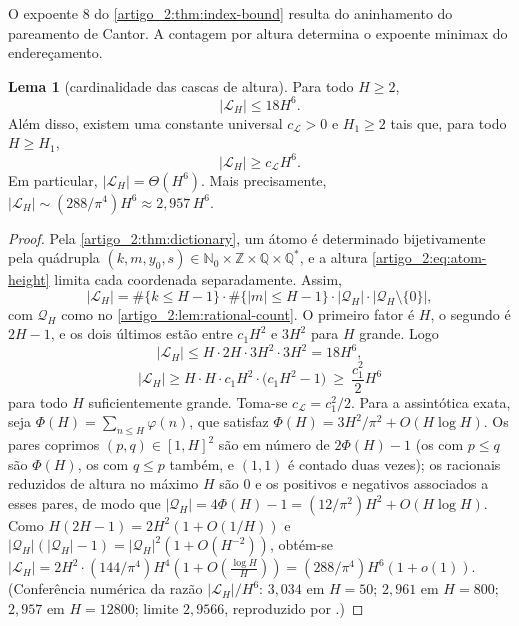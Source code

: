 \documentclass[12pt,a4paper]{article}
\theoremstyle{preciso}
\theoremstyle{definition}
\newcommand{\Nzero}{\mathbb{N}_0}
\newcommand{\Qstar}{\mathbb{Q}^{\!*}}
\newcommand{\Library}{\mathcal{L}}
\theoremstyle{preciso}
\theoremstyle{preciso}
\newtheorem{lemma}[teorema]{Lema}
\theoremstyle{preciso}
\theoremstyle{preciso}
\theoremstyle{definition}
\theoremstyle{preciso}
\theoremstyle{definition}
\theoremstyle{preciso}
\theoremstyle{preciso}
\theoremstyle{definition}
\begin{document}
O expoente $8$ do \cref{artigo_2:thm:index-bound} resulta do aninhamento do pareamento de Cantor. A contagem por altura determina o expoente minimax do endereçamento.

\begin{lemma}[cardinalidade das cascas de altura]\label{map:artigo_2:3.2}\label{artigo_2:lem:atom-count}
Para todo $H\ge2$,
\begin{equation}
 |\Library_H|\le18H^6.
 \label{artigo_2:eq:atom-count-upper}
\end{equation}
Além disso, existem uma constante universal $c_\Library>0$ e $H_1\ge2$ tais
que, para todo $H\ge H_1$,
\begin{equation}
 |\Library_H|\ge c_\Library H^6.
 \label{artigo_2:eq:atom-count}
\end{equation}
Em particular, $|\Library_H|=\Theta(H^6)$. Mais precisamente, $|\Library_H|\sim(288/\pi^4)H^6\approx2{,}957\,H^6$.
\end{lemma}

\begin{proof}
Pela \cref{artigo_2:thm:dictionary}, um átomo é determinado bijetivamente pela quádrupla $(k,m,y_0,s)\in\Nzero\times\mathbb{Z}\times\mathbb{Q}\times\Qstar$, e a altura \eqref{artigo_2:eq:atom-height} limita cada coordenada separadamente. Assim,
\[
 |\Library_H|=\#\{k\le H-1\}\cdot\#\{|m|\le H-1\}\cdot|\mathcal{Q}_H|\cdot|\mathcal{Q}_H\setminus\{0\}|,
\]
com $\mathcal{Q}_H$ como no \cref{artigo_2:lem:rational-count}. O primeiro fator é $H$, o segundo é $2H-1$, e os dois últimos estão entre $c_1H^2$ e $3H^2$ para $H$ grande. Logo
\[
 |\Library_H|\le H\cdot 2H\cdot 3H^2\cdot 3H^2=18H^6,
\]
\[
 |\Library_H|\ge H\cdot H\cdot c_1H^2\cdot\bigl(c_1H^2-1\bigr)\ \ge\ \frac{c_1^2}{2}H^6
\]
para todo $H$ suficientemente grande. Toma-se $c_\Library=c_1^2/2$. Para a assintótica exata, seja $\Phi(H)=\sum_{n\le H}\varphi(n)$, que satisfaz $\Phi(H)=3H^2/\pi^2+O(H\log H)$. Os pares coprimos $(p,q)\in[1,H]^2$ são em número de $2\Phi(H)-1$ (os com $p\le q$ são $\Phi(H)$, os com $q\le p$ também, e $(1,1)$ é contado duas vezes); os racionais reduzidos de altura no máximo $H$ são $0$ e os positivos e negativos associados a esses pares, de modo que $|\mathcal Q_H|=4\Phi(H)-1=(12/\pi^2)H^2+O(H\log H)$. Como $H(2H-1)=2H^2(1+O(1/H))$ e $|\mathcal Q_H|(|\mathcal Q_H|-1)=|\mathcal Q_H|^2(1+O(H^{-2}))$, obtém-se $|\Library_H|=2H^2\cdot(144/\pi^4)H^4(1+O(\tfrac{\log H}{H}))=(288/\pi^4)H^6(1+o(1))$. (Conferência numérica da razão $|\Library_H|/H^6$: $3{,}034$ em $H=50$; $2{,}961$ em $H=800$; $2{,}957$ em $H=12800$; limite $2{,}9566$, reproduzido por .)
\end{proof}
\end{document}
